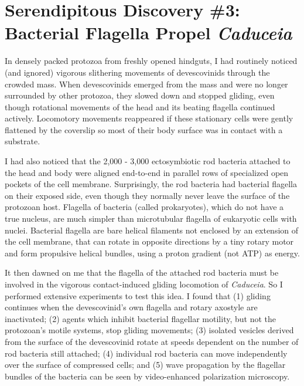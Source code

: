 \documentclass[authordate, editorial]{jote-new-article}
\begin{document}
	\section{Serendipitous Discovery \#3: Bacterial Flagella Propel \emph{Caduceia} }







	In densely packed protozoa from freshly opened hindguts, I had routinely noticed (and ignored) vigorous slithering movements of devescovinids through the crowded mass. When devescovinids emerged from the mass and were no longer surrounded by other protozoa, they slowed down and stopped gliding, even though rotational movements of the head and its beating flagella continued actively. Locomotory movements reappeared if these stationary cells were gently flattened by the coverslip so most of their body surface was in contact with a substrate.







	I had also noticed that the 2,000 - 3,000 ectosymbiotic rod bacteria attached to the head and body were aligned end-to-end in parallel rows of specialized open pockets of the cell membrane. Surprisingly, the rod bacteria had bacterial flagella on their exposed side, even though they normally never leave the surface of the protozoan host. Flagella of bacteria (called prokaryotes), which do not have a true nucleus, are much simpler than microtubular flagella of eukaryotic cells with nuclei. Bacterial flagella are bare helical filaments not enclosed by an extension of the cell membrane, that can rotate in opposite directions by a tiny rotary motor and form propulsive helical bundles, using a proton gradient (not ATP) as energy.







	It then dawned on me that the flagella of the attached rod bacteria must be involved in the vigorous contact-induced gliding locomotion of \emph{Caduceia}. So I performed extensive experiments to test this idea. I found that (1) gliding continues when the devescovinid's own flagella and rotary axostyle are inactivated; (2) agents which inhibit bacterial flagellar motility, but not the protozoan's motile systems, stop gliding movements; (3) isolated vesicles derived from the surface of the devescovinid rotate at speeds dependent on the number of rod bacteria still attached; (4) individual rod bacteria can move independently over the surface of compressed cells; and (5) wave propagation by the flagellar bundles of the bacteria can be seen by video-enhanced polarization microscopy.
\end{document}
